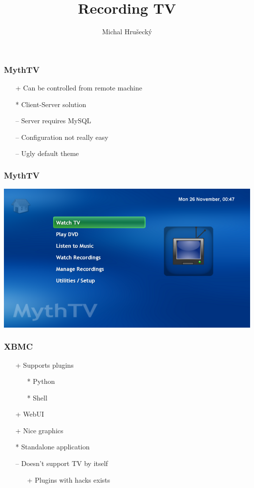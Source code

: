 \documentclass{beamer}
\author{Michal Hru\v{s}eck\'{y}}
\title{Recording TV}
\institute{openSUSE Boosters team}
\begin{document}
\titlepage


\begin{frame}[t]
	\frametitle{MythTV}
	\begin{itemize}
		\item[+] Can be controlled from remote machine
		\item[*] Client-Server solution
		\item[--] Server requires MySQL
		\item[--] Configuration not really easy
		\item[--] Ugly default theme
	\end{itemize}
\end{frame}

\begin{frame}[t]
	\frametitle{MythTV}
	\begin{center}
	\includegraphics[width=.8\paperwidth]{mythtv}
	\end{center}
\end{frame}

\begin{frame}[t]
	\frametitle{XBMC}
	\begin{itemize}
		\item[+] Supports plugins
		\begin{itemize}
			\item[*] Python
			\item[*] Shell
		\end{itemize}
		\item[+] WebUI
		\item[+] Nice graphics
		\item[*] Standalone application
		\item[--] Doesn't support TV by itself
		\begin{itemize}
			\item[+] Plugins with hacks exists
		\end{itemize}
	\end{itemize}
\end{frame}
\end{document}
